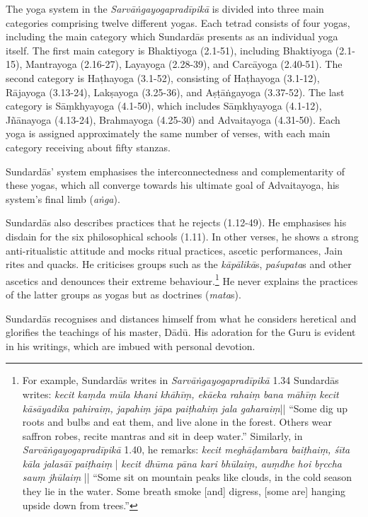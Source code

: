 The yoga system in the \emph{Sarvāṅgayogapradīpikā} is divided into three main categories comprising twelve different yogas. Each tetrad consists of four yogas, including the main category which Sundardās presents as an individual yoga itself.  The first main category is Bhaktiyoga (2.1-51), including Bhaktiyoga (2.1-15), Mantrayoga (2.16-27), Layayoga (2.28-39), and Carcāyoga (2.40-51). The second category is Haṭhayoga (3.1-52), consisting of Haṭhayoga (3.1-12), Rājayoga (3.13-24), Lakṣayoga (3.25-36), and Aṣṭāṅgayoga (3.37-52). The last category is Sāṃkhyayoga (4.1-50), which includes Sāṃkhyayoga (4.1-12), Jñānayoga (4.13-24), Brahmayoga (4.25-30) and Advaitayoga (4.31-50). Each yoga is assigned approximately the same number of verses, with each main category receiving about fifty stanzas.

Sundardās' system emphasises the interconnectedness and complementarity of these yogas, which all converge towards his ultimate goal of Advaitayoga, his system's final limb (\textit{aṅga}).  

Sundardās also describes practices that he rejects (1.12-49). He emphasises his disdain for the six philosophical schools (1.11). In other verses, he shows a strong anti-ritualistic attitude and mocks ritual practices, ascetic performances, Jain rites and quacks. He criticises groups such as the \textit{kāpālikā}s, \textit{paśupata}s and other ascetics and denounces their extreme behaviour.\footnote{For example, Sundardās writes in \emph{Sarvāṅgayogapradīpikā} 1.34 Sundardās writes: 
\textit{kecit kaṃda mūla khani khāhīṃ, ekāeka rahaiṃ bana māhīṃ} \textit{kecit kāsāyadika pahiraiṃ, japahiṃ jāpa paiṭhahiṃ jala gaharaiṃ}|| ``Some dig up roots and bulbs and eat them, and live alone in the forest. Others wear saffron robes, recite mantras and sit in deep water.'' Similarly, in \emph{Sarvāṅgayogapradīpikā} 1.40, he remarks: \textit{kecit meghāḍambara baiṭhaiṃ, śīta kāla jalasāī paiṭhaiṃ} | \textit{kecit dhūma pāna kari bhūlaiṃ, auṃdhe hoi bṛccha sauṃ jhūlaiṃ} || ``Some sit on mountain peaks like clouds, in the cold season they lie in the water. Some breath smoke [and] digress, [some are] hanging upside down from trees.''} He never explains the practices of the latter groups as yogas but as doctrines (\textit{mata}s).

Sundardās recognises and distances himself from what he considers heretical and glorifies the teachings of his master, Dādū. His adoration for the Guru is evident in his writings, which are imbued with personal devotion.

